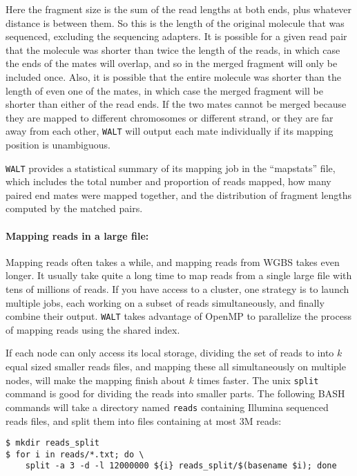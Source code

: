 \documentclass[10pt]{article}
\newcommand{\prog}[1]{\texttt{#1}}
\newcommand{\fn}[1]{\texttt{#1}}
\begin{document}
Here the fragment size is the sum of the read lengths at
both ends, plus whatever distance is between them. So this is the
length of the original molecule that was sequenced, excluding the
sequencing adapters. It is possible for a given read pair that the
molecule was shorter than twice the length of the reads, in which case
the ends of the mates will overlap, and so in the merged fragment will
only be included once. Also, it is possible that the entire molecule
was shorter than the length of even one of the mates, in which case
the merged fragment will be shorter than either of the read ends. If
the two mates cannot be merged because they are mapped to different
chromosomes or different strand, or they are far away from each other,
\prog{WALT} will output each mate individually if its mapping
position is unambiguous.  

\prog{WALT} provides a statistical summary
of its mapping job in the ``mapstats'' file, which includes the total
number and proportion of reads mapped, how many paired end mates were
mapped together, and the distribution of fragment lengths computed by
the matched pairs.


\paragraph{Mapping reads in a large file:} 
Mapping reads often takes a while, and mapping reads from WGBS takes
even longer. It usually take quite a long time to map reads from a
single large file with tens of millions of reads. If you have access
to a cluster, one strategy is to launch multiple jobs, each working on
a subset of reads simultaneously, and finally combine their output. 
\prog{WALT} takes advantage of OpenMP to parallelize the process of
mapping reads using the shared index.

If each node can only access its local storage, dividing the set of
reads to into $k$ equal sized smaller reads files, and mapping these
all simultaneously on multiple nodes, will make the mapping finish
about $k$ times faster.  The unix \prog{split} command is good for
dividing the reads into smaller parts. The following BASH commands
will take a directory named \fn{reads} containing Illumina sequenced
reads files, and split them into files containing at most 3M reads:

\begin{verbatim}
$ mkdir reads_split
$ for i in reads/*.txt; do \
    split -a 3 -d -l 12000000 ${i} reads_split/$(basename $i); done
\end{verbatim}
\end{document}
